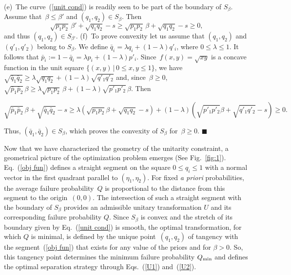 \documentclass[aps,pra,twocolumn,showpacs]{revtex4-1}
\begin{document}
{ (e)~The curve~(\ref{unit cond}) is readily seen to be part of the boundary of $S_\beta$. 
Assume that~$\beta\le\beta'$ and $(q_1,q_2)\in S_\beta$. Then 
%
\begin{equation}
\sqrt{p_1 p_2}\,\beta'+\sqrt{q_1 q_2}-s\ge \sqrt{p_1 p_2}\,\beta+\sqrt{q_1 q_2}-s\ge0,
\end{equation}
%
and thus $(q_1,q_2)\in S_{\beta'}$. (f)~To prove convexity let us assume that $(q_1,q_2)$ and $(q'_1,q'_2)$ belong to $S_\beta$. We define $\bar q_i=\lambda q_i+(1-\lambda)q'_i$, where $0\le\lambda\le1$. It follows that $\bar p_i:=1-\bar q_i=\lambda p_i+(1-\lambda)p'_i$. Since~$f(x,y)=\sqrt{xy}$ is a concave function in the unit square $\{(x,y)\, |\, 0\le x,y\le 1\}$, we have $\sqrt{\bar q_1\bar q_2}\ge \lambda \sqrt{q_1q_2}+(1-\lambda)\sqrt{q'_1q'_2}$ and, since~$\beta\ge0$, $\sqrt{\bar p_1\bar p_2}\,\beta\ge \lambda \sqrt{p_1p_2}\,\beta+(1-\lambda)\sqrt{p'_1p'_2}\,\beta$. Then
%
\begin{widetext}
\begin{equation}
\sqrt{\bar p_1 \bar p_2}\,\beta+\sqrt{\bar q_1 \bar q_2}-s\ge \lambda\left(\sqrt{p_1p_2}\beta+\sqrt{q_1q_2}-s\right)+(1-\lambda)\left(\sqrt{p'_1p'_2}\beta+\sqrt{q'_1q'_2}-s\right)\ge 0.
\end{equation}
\end{widetext}
%
Thus, $(\bar q_1,\bar q_2)\in S_\beta$, which proves the convexity of $S_\beta$ for~$\beta\ge0$.
$\blacksquare$

 Now that we have characterized the geometry of the unitarity constraint, a geometrical picture of the optimization problem emerges (See Fig.~\ref{fig:1}). 
Eq.~(\ref{obj fun}) defines a straight segment  on the square $0\le q_i\le 1$ with a normal vector in the first quadrant parallel to $(\eta_1,\eta_2)$. For fixed {\em a priori} probabilities, the average failure probability~$Q$ is proportional to the distance from this segment to the origin~$(0,0)$. The intersection of such a straight segment 
with the boundary 
of $S_\beta$ provides an admissible unitary transformation $U$ and its corresponding failure probability $Q$.
Since $S_{\beta}$ is convex and the stretch of its boundary given by Eq.~(\ref{unit cond}) is smooth, the optimal transformation, for which $Q$ is minimal, is defined by the unique point~$(q_1,q_2)$ of tangency with the segment~(\ref{obj fun}) that exists for any value of the priors and for $\beta>0$.
So, this tangency point determines the minimum failure probability $Q_{\rm min}$ and defines the optimal separation strategy through Eqs.~(\ref{U1}) and~(\ref{U2}). %

}
\end{document}
